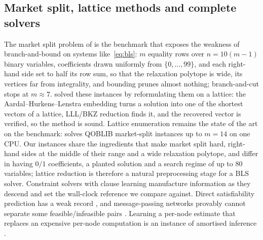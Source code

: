 \documentclass[final,5p,times,twocolumn,authoryear]{elsarticle}
\begin{document}
\subsection{Market split, lattice methods and complete solvers}
The market split problem of \citet{cornuejols1999class} is the benchmark that exposes the weakness of branch-and-bound on systems like~\eqref{eq:bls}: $m$ equality rows over $n=10(m-1)$ binary variables, coefficients drawn uniformly from $\{0,\dots,99\}$, and each right-hand side set to half its row sum, so that the relaxation polytope is wide, its vertices far from integrality, and bounding prunes almost nothing; branch-and-cut stops at $m\approx7$. \citet{aardal2000diophantine,aardal2000market} solved these instances by reformulating them on a lattice: the Aardal--Hurkens--Lenstra embedding turns a solution into one of the shortest vectors of a lattice, LLL/BKZ reduction \citep{lenstra1982factoring,schnorr1994lattice} finds it, and the recovered vector is verified, so the method is sound. Lattice enumeration remains the state of the art on the benchmark: \citet{wassermann2025solving} solves QOBLIB market-split instances up to $m=14$ on one CPU. Our instances share the ingredients that make market split hard, right-hand sides at the middle of their range and a wide relaxation polytope, and differ in having $0/1$ coefficients, a planted solution and a search regime of up to $80$ variables; lattice reduction is therefore a natural preprocessing stage for a BLS solver. Constraint solvers with clause learning \citep{marquessilva1999grasp,ohrimenko2009propagation} manufacture information as they descend and set the wall-clock reference we compare against. Direct satisfiability prediction has a weak record \citep{selsam2019neurosat,li2023g4satbench}, and message-passing networks provably cannot separate some feasible/infeasible pairs \citep{chen2023representing}. Learning a per-node estimate that replaces an expensive per-node computation is an instance of amortised inference \citep{amos2023tutorial,gershman2014amortized}.
\end{document}
